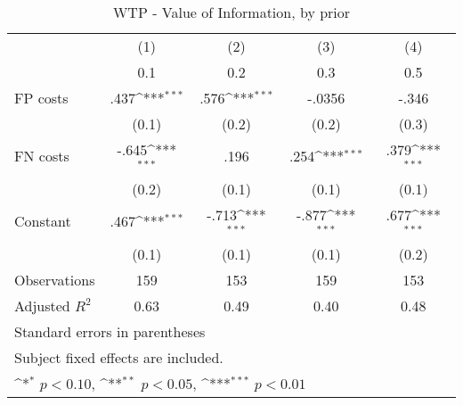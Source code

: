 \begin{table}[htbp]\centering
\def\sym#1{\ifmmode^{#1}\else\(^{#1}\)\fi}
\caption{WTP - Value of Information, by prior}
\begin{tabular}{l*{4}{c}}
\hline\hline
                &\multicolumn{1}{c}{(1)}&\multicolumn{1}{c}{(2)}&\multicolumn{1}{c}{(3)}&\multicolumn{1}{c}{(4)}\\
                &\multicolumn{1}{c}{0.1}&\multicolumn{1}{c}{0.2}&\multicolumn{1}{c}{0.3}&\multicolumn{1}{c}{0.5}\\
\hline
FP costs        &     .437\sym{***}&     .576\sym{***}&   -.0356         &    -.346         \\
                &    (0.1)         &    (0.2)         &    (0.2)         &    (0.3)         \\
FN costs        &    -.645\sym{***}&     .196         &     .254\sym{***}&     .379\sym{***}\\
                &    (0.2)         &    (0.1)         &    (0.1)         &    (0.1)         \\
Constant        &     .467\sym{***}&    -.713\sym{***}&    -.877\sym{***}&     .677\sym{***}\\
                &    (0.1)         &    (0.1)         &    (0.1)         &    (0.2)         \\
\hline
Observations    &      159         &      153         &      159         &      153         \\
Adjusted \(R^{2}\)&     0.63         &     0.49         &     0.40         &     0.48         \\
\hline\hline
\multicolumn{5}{l}{\footnotesize Standard errors in parentheses}\\
\multicolumn{5}{l}{\footnotesize Subject fixed effects are included.}\\
\multicolumn{5}{l}{\footnotesize \sym{*} \(p<0.10\), \sym{**} \(p<0.05\), \sym{***} \(p<0.01\)}\\
\end{tabular}
\end{table}
